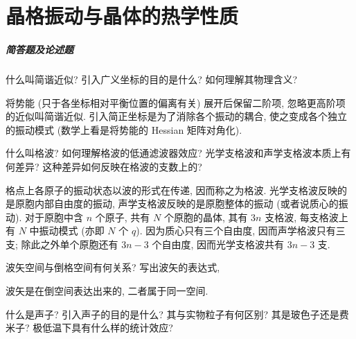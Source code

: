 \documentclass[UTF8]{ctexart}
\newenvironment{Answer}{}{}
\begin{document}
\section{晶格振动与晶体的热学性质}
    \subparagraph{简答题及论述题}
        \begin{Question}
            \item 什么叫简谐近似? 引入广义坐标的目的是什么? 如何理解其物理含义?

\begin{Answer}
    \begin{Solve}[Solve:]
        \hspace*{2em}将势能 (只于各坐标相对平衡位置的偏离有关) 展开后保留二阶项, 忽略更高阶项的近似叫简谐近似. 引入简正坐标是为了消除各个振动的耦合, 使之变成各个独立的振动模式 (数学上看是将势能的 Hessian 矩阵对角化).
    \end{Solve}
\end{Answer}

            \item 什么叫格波? 如何理解格波的低通滤波器效应? 光学支格波和声学支格波本质上有何差异? 这种差异如何反映在格波的支数上的?

\begin{Answer}
    \begin{Solve}[Solve:]
        \hspace*{2em}格点上各原子的振动状态以波的形式在传递, 因而称之为格波. 光学支格波反映的是原胞内部自由度的振动, 声学支格波反映的是原胞整体的振动 (或者说质心的振动). 对于原胞中含 $n$ 个原子, 共有 $N$ 个原胞的晶体, 其有 $3n$ 支格波, 每支格波上有 $N$ 中振动模式 (亦即 $N$ 个 $q$). 因为质心只有三个自由度, 因而声学格波只有三支; 除此之外单个原胞还有 $3n - 3$ 个自由度, 因而光学支格波共有 $3n - 3$ 支.
    \end{Solve}
\end{Answer}

            \item 波矢空间与倒格空间有何关系? 写出波矢的表达式,

\begin{Answer}
    \begin{Solve}[Solve:]
        \hspace*{2em}波矢是在倒空间表达出来的, 二者属于同一空间.
    \end{Solve}
\end{Answer}

            \item 什么是声子? 引入声子的目的是什么? 其与实物粒子有何区别? 其是玻色子还是费米子? 极低温下具有什么样的统计效应?


\end{Question}
\end{document}
